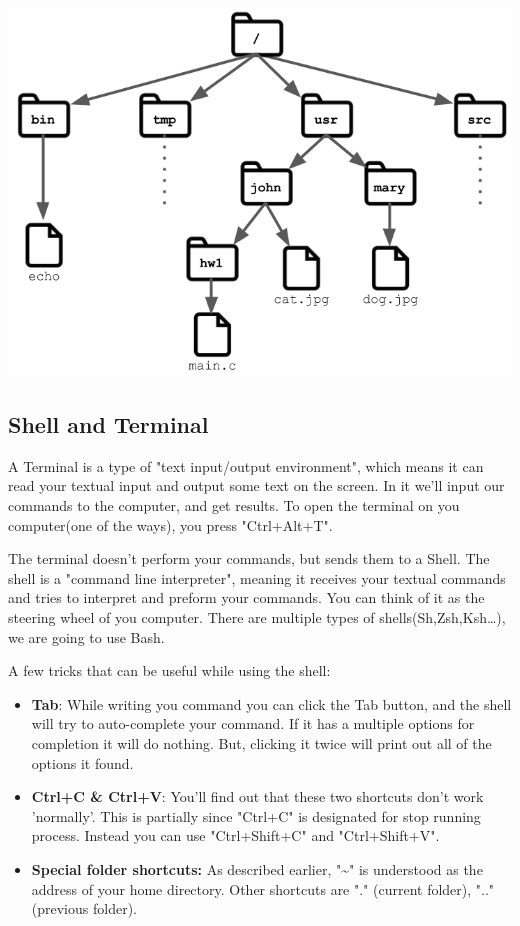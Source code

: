 \documentclass[11pt]{article}
\begin{document}
\begin{center}
	\includegraphics[scale=0.3]{file_tree.png}
\end{center}
\subsection{Shell and Terminal}
 A Terminal is a type of "text input/output environment", which means it can read your textual input and output some text on the screen. In it we'll input our commands to the computer, and get results.
 To open the terminal on you computer(one of the ways), you press "Ctrl+Alt+T". 
 
\noindent The terminal doesn't perform your commands, but sends them to a Shell. The shell is a "command line interpreter", meaning it receives your textual commands and tries to interpret and preform your commands. You can think of it as the steering wheel of you computer. There are multiple types of shells(Sh,Zsh,Ksh\ldots), we are going to use Bash. 
 
 A few tricks that can be useful while using the shell:
 \smallskip
 \begin{itemize}
 	\item {\bf Tab}: While writing you command you can click the Tab button, and the shell will try to auto-complete your command. If it has a multiple options for completion it will do nothing. But, clicking it twice will print out all of the options it found.
 	\item {\bf Ctrl+C \& Ctrl+V}: You'll find out that these two shortcuts don't work 'normally'. This is partially since "Ctrl+C" is designated for stop running process. Instead you can use "Ctrl+Shift+C" and "Ctrl+Shift+V".
 	\item {\bf Special folder shortcuts:} As described earlier, "\textasciitilde" is understood as the address of your home directory. Other shortcuts are "." (current folder), ".." (previous folder).
 	
 \end{itemize}
 
\end{document}
